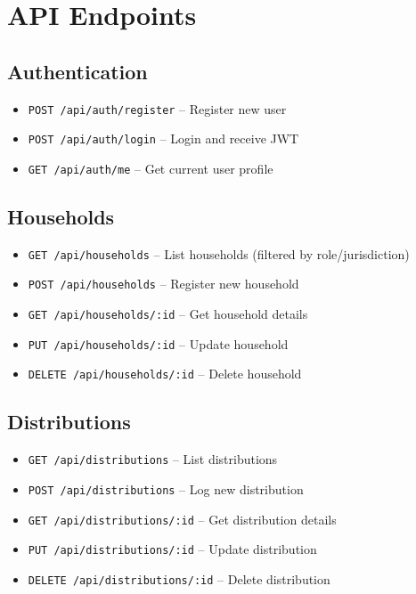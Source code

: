 \chapter{API Endpoints}
\label{app:api}

\section{Authentication}
\begin{itemize}[leftmargin=1.2cm]
    \item \texttt{POST /api/auth/register} -- Register new user
    \item \texttt{POST /api/auth/login} -- Login and receive JWT
    \item \texttt{GET /api/auth/me} -- Get current user profile
\end{itemize}

\section{Households}
\begin{itemize}[leftmargin=1.2cm]
    \item \texttt{GET /api/households} -- List households (filtered by role/jurisdiction)
    \item \texttt{POST /api/households} -- Register new household
    \item \texttt{GET /api/households/:id} -- Get household details
    \item \texttt{PUT /api/households/:id} -- Update household
    \item \texttt{DELETE /api/households/:id} -- Delete household
\end{itemize}

\section{Distributions}
\begin{itemize}[leftmargin=1.2cm]
    \item \texttt{GET /api/distributions} -- List distributions
    \item \texttt{POST /api/distributions} -- Log new distribution
    \item \texttt{GET /api/distributions/:id} -- Get distribution details
    \item \texttt{PUT /api/distributions/:id} -- Update distribution
    \item \texttt{DELETE /api/distributions/:id} -- Delete distribution
\end{itemize}

